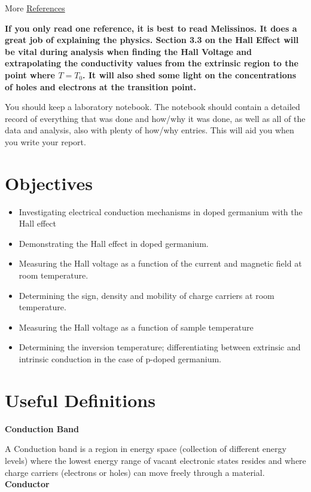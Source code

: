 \documentclass{../lab}
\begin{document}
More \hyperref[sec:References]{References}

\textbf{If you only read one reference, it is best to read Melissinos. It does a great job of explaining the physics. Section 3.3 on the Hall Effect will be vital during analysis when finding the Hall Voltage and extrapolating the conductivity values from the extrinsic region to the point where $T = T_{0}$. It will also shed some light on the concentrations of holes and electrons at the transition point.}

You should keep a laboratory notebook. The notebook should contain a detailed record of everything that was done and how/why it was done, as well as all of the data and analysis, also with plenty of how/why entries. This will aid you when you write your report.

\section{Objectives}

\begin{itemize}
    \item Investigating electrical conduction mechanisms in doped germanium with the Hall effect

    \item Demonstrating the Hall effect in doped germanium.

    \item Measuring the Hall voltage as a function of the current and magnetic field at room temperature.

    \item Determining the sign, density and mobility of charge carriers at room temperature.

    \item Measuring the Hall voltage as a function of sample temperature

    \item Determining the inversion temperature; differentiating between extrinsic and intrinsic conduction in the case of p-doped germanium.

\end{itemize}

\section{Useful Definitions}

\textbf{Conduction Band}

A Conduction band is a region in energy space (collection of different energy levels) where the lowest energy range of vacant electronic states resides and where charge carriers (electrons or holes) can move freely through a material.
\newpage
\textbf{Conductor}
\end{document}
